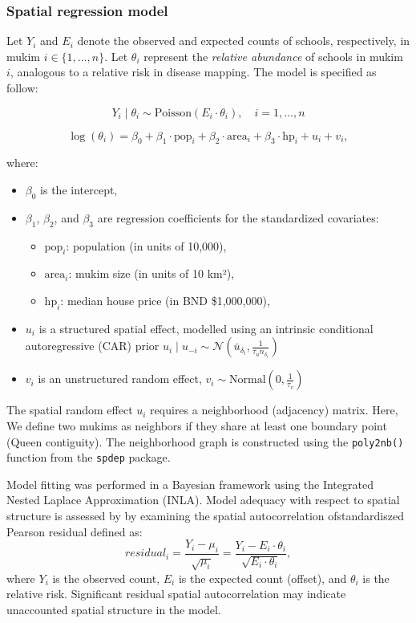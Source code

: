 \documentclass[
  12pt,
]{article}
\providecommand{\tightlist}{%
  \setlength{\itemsep}{0pt}\setlength{\parskip}{0pt}}
\begin{document}
\subsubsection{Spatial regression model}\label{spatial-regression-model}

Let \(Y_i\) and \(E_i\) denote the observed and expected counts of
schools, respectively, in mukim \(i \in \{1, \dotsc, n\}\). Let
\(\theta_i\) represent the \emph{relative abundance} of schools in mukim
\(i\), analogous to a relative risk in disease mapping. The model is
specified as follow:

\[
Y_i \mid \theta_i \sim \text{Poisson}(E_i \cdot \theta_i), \quad i = 1, \dotsc, n
\]

\[
\log(\theta_i) = \beta_0 + \beta_1 \cdot \text{pop}_i + \beta_2 \cdot \text{area}_i + \beta_3 \cdot \text{hp}_i + u_i + v_i,
\]

where:

\begin{itemize}
\tightlist
\item
  \(\beta_0\) is the intercept,
\item
  \(\beta_1\), \(\beta_2\), and \(\beta_3\) are regression coefficients
  for the standardized covariates:

  \begin{itemize}
  \tightlist
  \item
    \(\text{pop}_i\): population (in units of 10,000),
  \item
    \(\text{area}_i\): mukim size (in units of 10 km²),
  \item
    \(\text{hp}_i\): median house price (in BND \$1,000,000),
  \end{itemize}
\item
  \(u_i\) is a structured spatial effect, modelled using an intrinsic
  conditional autoregressive (CAR) prior
  \(u_i \mid u_{-i} \sim \mathcal{N}(\bar{u}_{\delta_i}, \frac{1}{\tau_u n_{\delta_i}})\)
\item
  \(v_i\) is an unstructured random effect,
  \(v_i \sim \text{Normal}(0, \frac{1}{\tau_v})\)
\end{itemize}

The spatial random effect \(u_i\) requires a neighborhood (adjacency)
matrix. Here, We define two mukims as neighbors if they share at least
one boundary point (Queen contiguity). The neighborhood graph is
constructed using the \texttt{poly2nb()} function from the
\texttt{spdep} package.

Model fitting was performed in a Bayesian framework using the Integrated
Nested Laplace Approximation (INLA). Model adequacy with respect to
spatial structure is assessed by by examining the spatial
autocorrelation ofstandardiszed Pearson residual defined as:
\[residual_i = \dfrac{Y_i - \mu_i}{\sqrt{\mu_i}} = \dfrac{Y_i - E_i \cdot \theta_i}{\sqrt{E_i \cdot \theta_i}},\]
where \(Y_i\) is the observed count, \(E_i\) is the expected count
(offset), and \(\theta_i\) is the relative risk. Significant residual
spatial autocorrelation may indicate unaccounted spatial structure in
the model.
\end{document}
